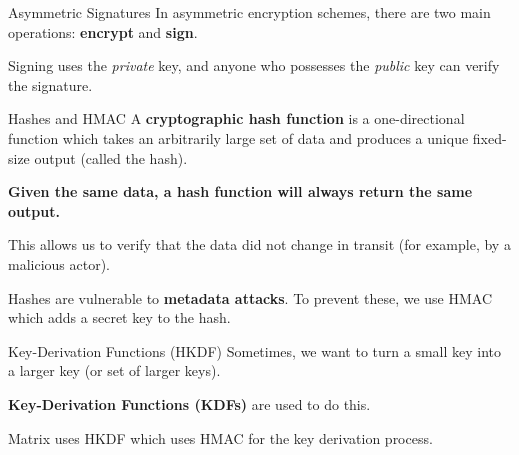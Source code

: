 \documentclass{beeper}
\begin{document}
\begin{frame}{Asymmetric Signatures}
    In asymmetric encryption schemes, there are two main operations:
    \textbf{encrypt} and \textbf{sign}.
    \pause


    Signing uses the \textit{private} key, and anyone who possesses the
    \textit{public} key can verify the signature.
\end{frame}

\begin{frame}{Hashes and HMAC}
    A \textbf{cryptographic hash function} is a one-directional function which
    takes an arbitrarily large set of data and produces a unique fixed-size
    output (called the hash).
    \pause

    \textbf{Given the same data, a hash function will always return the same
    output.}
    \pause

    This allows us to verify that the data did not change in transit (for
    example, by a malicious actor).
    \pause

    Hashes are vulnerable to \textbf{metadata attacks}. To prevent these, we use
    HMAC which adds a secret key to the hash.

\end{frame}

\begin{frame}{Key-Derivation Functions (HKDF)}
    Sometimes, we want to turn a small key into a larger key (or set of larger
    keys).


    \textbf{Key-Derivation Functions (KDFs)} are used to do this.
    \pause

    Matrix uses HKDF which uses HMAC for the key derivation process.
\end{frame}
\end{document}
